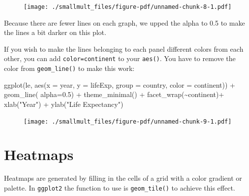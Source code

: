 \documentclass[
  letterpaper,
  DIV=11,
  numbers=noendperiod]{scrreprt}
\newenvironment{Shaded}{\begin{snugshade}}{\end{snugshade}}
\newcommand{\AttributeTok}[1]{\textcolor[rgb]{0.40,0.45,0.13}{#1}}
\newcommand{\FloatTok}[1]{\textcolor[rgb]{0.68,0.00,0.00}{#1}}
\newcommand{\FunctionTok}[1]{\textcolor[rgb]{0.28,0.35,0.67}{#1}}
\newcommand{\NormalTok}[1]{\textcolor[rgb]{0.00,0.23,0.31}{#1}}
\newcommand{\SpecialCharTok}[1]{\textcolor[rgb]{0.37,0.37,0.37}{#1}}
\newcommand{\StringTok}[1]{\textcolor[rgb]{0.13,0.47,0.30}{#1}}
\begin{document}
\begin{figure}[H]

{\centering \texttt{[image: ./smallmult\_files/figure-pdf/unnamed-chunk-8-1.pdf]}

}

\end{figure}

Because there are fewer lines on each graph, we upped the alpha to 0.5
to make the lines a bit darker on this plot.

If you wish to make the lines belonging to each panel different colors
from each other, you can add \texttt{color=continent} to your
\texttt{aes()}. You have to remove the color from \texttt{geom\_line()}
to make this work:

\begin{Shaded}
\begin{Highlighting}[]
\FunctionTok{ggplot}\NormalTok{(le, }\FunctionTok{aes}\NormalTok{(}\AttributeTok{x =}\NormalTok{ year, }\AttributeTok{y =}\NormalTok{ lifeExp, }\AttributeTok{group =}\NormalTok{ country, }\AttributeTok{color =}\NormalTok{ continent)) }\SpecialCharTok{+} 
  \FunctionTok{geom\_line}\NormalTok{( }\AttributeTok{alpha=}\FloatTok{0.5}\NormalTok{) }\SpecialCharTok{+}
  \FunctionTok{theme\_minimal}\NormalTok{() }\SpecialCharTok{+}
  \FunctionTok{facet\_wrap}\NormalTok{(}\SpecialCharTok{\textasciitilde{}}\NormalTok{continent)}\SpecialCharTok{+}
  \FunctionTok{xlab}\NormalTok{(}\StringTok{"Year"}\NormalTok{) }\SpecialCharTok{+}
  \FunctionTok{ylab}\NormalTok{(}\StringTok{"Life Expectancy"}\NormalTok{)}
\end{Highlighting}
\end{Shaded}

\begin{figure}[H]

{\centering \texttt{[image: ./smallmult\_files/figure-pdf/unnamed-chunk-9-1.pdf]}

}

\end{figure}


\hypertarget{heatmaps}{%
\chapter{Heatmaps}\label{heatmaps}}

Heatmaps are generated by filling in the cells of a grid with a color
gradient or palette. In \texttt{ggplot2} the function to use is
\texttt{geom\_tile()} to achieve this effect.
\end{document}
